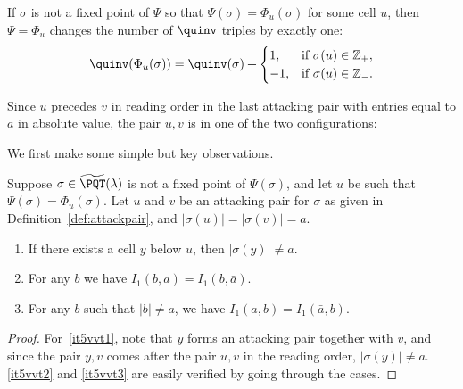 \begin{lemma}\label{lem:A1quinv}
If $\sigma$ is not a fixed point of $\Psi$ so that $\Psi(\sigma)=\Phi_u(\sigma)$ for some cell $u$, then $\Psi=\Phi_u$ changes the number of $\quinv$ triples by exactly one:
\[
\quinv(\Phi_u(\sigma))=\quinv(\sigma)+\begin{cases} 1,&\mbox{if}\ \sigma(u)\in\mathbb{Z}_+,\\ -1,&\mbox{if}\ \sigma(u)\in\mathbb{Z}_-.\\\end{cases}
\]
\end{lemma}

Since $u$ precedes $v$ in reading order in the last attacking pair with entries equal to $a$ in absolute value, the pair $u,v$ is in one of the two configurations:
\begin{center}
\end{center}

We first make some simple but key observations.

\begin{proposition}
\label{prop:attackpair}
Suppose $\sigma\in\widetilde{\PQT}(\lambda)$ is not a fixed point of $\Psi(\sigma)$, and let $u$ be such that $\Psi(\sigma)=\Phi_u(\sigma)$. Let $u$ and $v$ be an attacking pair for $\sigma$ as given in Definition~\ref{def:attackpair}, and $|\sigma(u)|
= |\sigma(v)| = a$.

\begin{enumerate}[label=(\arabic*)]
\item  \label{it5vvt1} If there exists a cell $y$ below $u$, then $|\sigma(y)| \neq a$.

\item \label{it5vvt2} For any $b$ we have $I_1(b,a)=I_1(b,\bar{a})$.

\item  \label{it5vvt3} For any $b$ such that $|b| \neq a$, we have $I_1(a,b)=I_1(\bar{a},b)$.
\end{enumerate}

\end{proposition}

\begin{proof}
For~\ref{it5vvt1}, note that $y$ forms an attacking pair together with $v$, and since the pair $y,v$ comes after the pair $u,v$ in the reading order, $|\sigma(y)| \neq a$. \ref{it5vvt2} and \ref{it5vvt3} are easily verified by going through the cases.
\end{proof}

